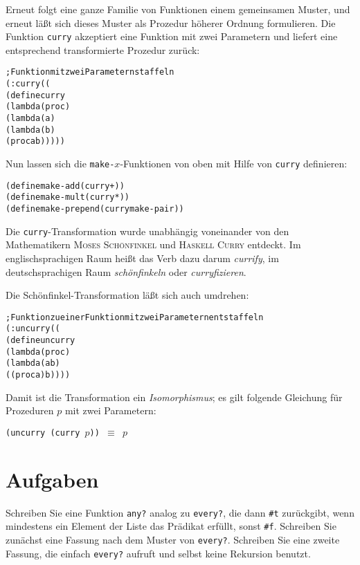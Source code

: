 %
Erneut folgt eine ganze Familie von Funktionen einem gemeinsamen
Muster, und erneut läßt sich dieses Muster als Prozedur höherer
Ordnung formulieren.  Die Funktion \texttt{curry} akzeptiert
eine Funktion mit zwei Parametern und liefert eine entsprechend
transformierte Prozedur zurück:
%
\begin{alltt}
; Funktion mit zwei Parametern staffeln
(: curry ((%a %b -> %c) -> (%a -> (%b -> %c))))
(define curry
  (lambda (proc)
    (lambda (a)
      (lambda (b)
        (proc a b)))))
\end{alltt}
%
Nun lassen sich die \texttt{make-$x$}-Funktionen von oben mit Hilfe
von \texttt{curry} definieren:
%
\begin{alltt}
(define make-add (curry +))
(define make-mult (curry *))
(define make-prepend (curry make-pair))
\end{alltt}
%
Die \texttt{curry}-Transformation wurde unabhängig voneinander von den
Mathematikern \textsc{Moses Schönfinkel} und \textsc{Haskell Curry} entdeckt.  Im
englischsprachigen Raum heißt das Verb dazu darum  \textit{currify}, im deutschsprachigen Raum
\textit{schönfinkeln}
oder \textit{curryfizieren}.

Die Schönfinkel-Transformation läßt sich auch umdrehen:
%
\begin{alltt}
; Funktion zu einer Funktion mit zwei Parametern entstaffeln
(: uncurry ((%a -> (%b -> %c)) -> (%a %b -> %c)))
(define uncurry 
  (lambda (proc)
    (lambda (a b)
      ((proc a) b))))
\end{alltt}
%
Damit ist die Transformation ein \textit{Isomorphismus}; es gilt
folgende Gleichung für Prozeduren $p$ mit zwei Parametern:\label{sec:curry-isomorphismus}
%
\begin{center}
  \texttt{(uncurry (curry \(p\))) \(\equiv\) \(p\)}
\end{center}

\section*{Aufgaben}

\begin{aufgabe}
  Schreiben Sie eine Funktion \texttt{any?} analog zu 
  \texttt{every?}, die dann \verb|#t| zurückgibt, wenn mindestens ein 
  Element der Liste das Prädikat erfüllt, sonst \verb|#f|.  Schreiben Sie 
  zunächst eine Fassung nach dem Muster von \texttt{every?}.  Schreiben 
  Sie eine zweite Fassung, die einfach \texttt{every?} aufruft und selbst keine
  Rekursion benutzt.
\end{aufgabe}

